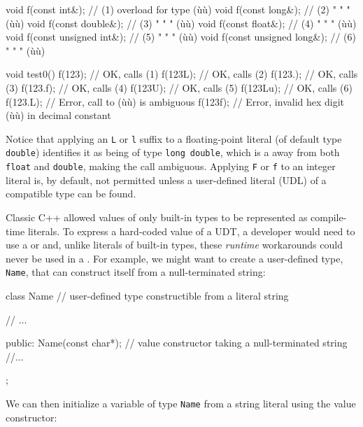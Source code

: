 \begin{emcppslisting}
void f(const int&);            // (1) overload for type (ù{}ù)
void f(const long&);           // (2)    "      "   "   (ù{}ù)
void f(const double&);         // (3)    "      "   "   (ù{}ù)
void f(const float&);          // (4)    "      "   "   (ù{}ù)
void f(const unsigned int&);   // (5)    "      "   "   (ù{}ù)
void f(const unsigned long&);  // (6)    "      "   "   (ù{}ù)

void test0()
{
    f(123);    // OK, calls (1)
    f(123L);   // OK, calls (2)
    f(123.);   // OK, calls (3)
    f(123.f);  // OK, calls (4)
    f(123U);   // OK, calls (5)
    f(123Lu);  // OK, calls (6)
    f(123.L);  // Error, call to (ù{}ù) is ambiguous
    f(123f);   // Error, invalid hex digit (ù{}ù) in decimal constant
}
\end{emcppslisting}

\noindent Notice that applying an \lstinline!L! or \lstinline!l! suffix to a
floating-point literal (of default type \lstinline!double!) identifies it
as being of type \lstinline!long!~\lstinline!double!, which is a
 away from both \lstinline!float! and
\lstinline!double!, making the call ambiguous. Applying \lstinline!F! or
\lstinline!f! to an integer literal is, by default, not permitted unless a
user-defined literal (UDL) of a compatible type can be found.

Classic C++ allowed values of only built-in types to be represented as
compile-time literals. To express a hard-coded value of a UDT, a
developer would need to use a  or
 and, unlike literals of built-in types, these
\emph{runtime} workarounds could never be used in a . For example, we might want to create a user-defined type,
\lstinline!Name!, that can construct itself from a null-terminated string:

\begin{emcppslisting}[emcppsbatch=e1]
class Name  // user-defined type constructible from a literal string
{
    // ...

public:
    Name(const char*);  // value constructor taking a null-terminated string
    //...
};
\end{emcppslisting}

\noindent We can then initialize a variable of type \lstinline!Name! from a string
literal using the value constructor:

